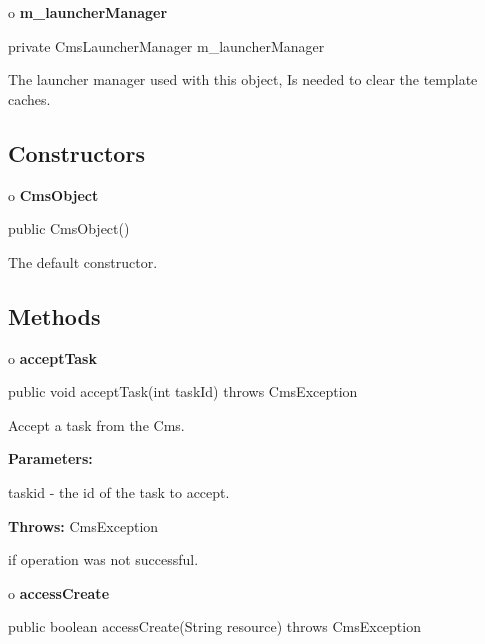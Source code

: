o {\bf m\_launcherManager} 

\begin{PRE}
 private CmsLauncherManager m\_launcherManager
\end{PRE}

\begin{description}
\htmlDD The launcher manager used with this object, Is needed to clear the
template caches.

\end{description}

\subsection*{  Constructors }

o {\bf CmsObject} 

\begin{PRE}
 public CmsObject()
\end{PRE}

\begin{description}
\htmlDD The default constructor. 

\end{description}

\subsection*{  Methods }

o {\bf acceptTask} 

\begin{PRE}
 public void acceptTask(int taskId) throws CmsException
\end{PRE}

\begin{description}
\htmlDD Accept a task from the Cms. 

\begin{description}
\item {\bf Parameters:}  

taskid - the id of the task to accept.  
\item {\bf Throws:} CmsException  

if operation was not successful.  
\end{description}

\end{description}

o {\bf accessCreate} 

\begin{PRE}
 public boolean accessCreate(String resource) throws CmsException
\end{PRE}

